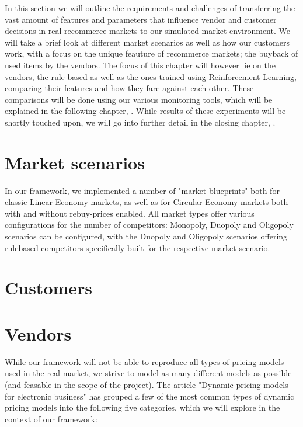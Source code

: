\begin{jointwork}
	In this section we will outline the requirements and challenges of transferring the vast amount of features and parameters that influence vendor and customer decisions in real recommerce markets to our simulated market environment. We will take a brief look at different market scenarios  as well as how our customers work, with a focus on the unique feauture of recommerce markets; the buyback of used items by the vendors. The focus of this chapter will however lie on the vendors, the rule based as well as the ones trained using Reinforcement Learning, comparing their features and how they fare against each other. These comparisons will be done using our various monitoring tools, which will be explained in the following chapter, . While results of these experiments will be shortly touched upon, we will go into further detail in the closing chapter, .
\end{jointwork}

\section{Market scenarios} \label{section:MarketScenarios}

In our framework, we implemented a number of "market blueprints" both for classic Linear Economy markets, as well as for Circular Economy markets both with and without rebuy-prices enabled. All market types offer various configurations for the number of competitors: Monopoly, Duopoly and Oligopoly scenarios can be configured, with the Duopoly and Oligopoly scenarios offering rulebased competitors specifically built for the respective market scenario.

\section{Customers}
\section{Vendors} \label{section:ExplainVendors}

While our framework will not be able to reproduce all types of pricing models used in the real market, we strive to model as many different models as possible (and feasable in the scope of the project). The article "Dynamic pricing models for electronic business" \cite{dynamicPricingModels} has grouped a few of the most common types of dynamic pricing models into the following five categories, which we will explore in the context of our framework:

